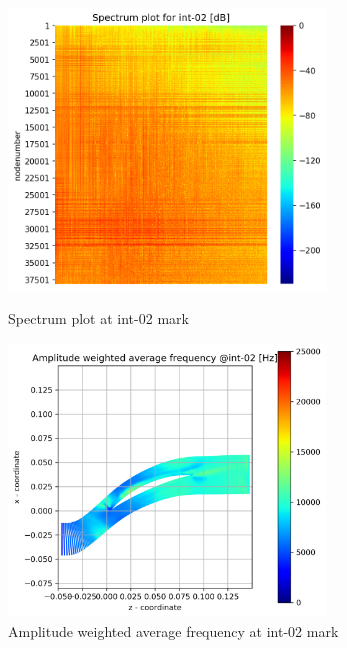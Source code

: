 \begin{figure}[ht]
  \centering
  \includegraphics[width=0.75\textwidth]{Figures/int-02_spectrum.png}
  \caption{Spectrum plot at int-02 mark} \label{int-02-spectrum}
  
  \vspace*{\floatsep}%

  \includegraphics[width=0.75\textwidth]{Figures/int-02-awaf.png}
  \caption{Amplitude weighted average frequency at int-02 mark} \label{int-02-awaf}
\end{figure}
